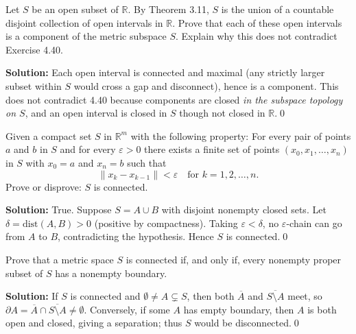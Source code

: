 \begin{problembox}
Let $S$ be an open subset of $\mathbb{R}$. By Theorem 3.11, $S$ is the union of a countable disjoint collection of open intervals in $\mathbb{R}$. Prove that each of these open intervals is a component of the metric subspace $S$. Explain why this does not contradict Exercise 4.40.
\end{problembox}

\noindent\textbf{Solution:}
Each open interval is connected and maximal (any strictly larger subset within $S$ would cross a gap and disconnect), hence is a component. This does not contradict 4.40 because components are closed \emph{in the subspace topology on $S$}, and an open interval is closed in $S$ though not closed in $\mathbb{R}$.\qed



\begin{problembox}
Given a compact set $S$ in $\mathbb{R}^m$ with the following property: For every pair of points $a$ and $b$ in $S$ and for every $\varepsilon > 0$ there exists a finite set of points $(x_0, x_1, \ldots, x_n)$ in $S$ with $x_0 = a$ and $x_n = b$ such that
\[\|x_k - x_{k-1}\| < \varepsilon \quad \text{for } k = 1, 2, \ldots, n.\]
Prove or disprove: $S$ is connected.
\end{problembox}

\noindent\textbf{Solution:}
True. Suppose $S=A\cup B$ with disjoint nonempty closed sets. Let $\delta=\mathrm{dist}(A,B)>0$ (positive by compactness). Taking $\varepsilon<\delta$, no $\varepsilon$-chain can go from $A$ to $B$, contradicting the hypothesis. Hence $S$ is connected.\qed



\begin{problembox}
Prove that a metric space $S$ is connected if, and only if, every nonempty proper subset of $S$ has a nonempty boundary.
\end{problembox}

\noindent\textbf{Solution:}
If $S$ is connected and $\emptyset\ne A\subsetneq S$, then both $\overline{A}$ and $\overline{S\setminus A}$ meet, so $\partial A=\overline{A}\cap\overline{S\setminus A}\ne\emptyset$. Conversely, if some $A$ has empty boundary, then $A$ is both open and closed, giving a separation; thus $S$ would be disconnected.\qed



